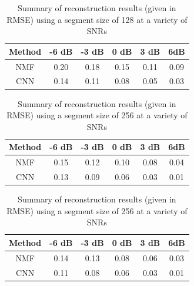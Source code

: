 \documentclass[12pt,chapterheads]{ucsd}
\begin{document}
\vspace{0.25in}
\begin{table}[!ht]
\caption{Summary of reconstruction results (given in RMSE) using a segment size of 128 at a variety of SNRs}

\vspace{-0.25in}
\begin{center}
\begin{tabular}{| c | c | c |  c | c | c |}

\hline
Method & -6 dB & -3 dB & 0 dB & 3 dB & 6dB \\

\hline
NMF & 0.20 & 0.18 & 0.15 & 0.11 & 0.09 \\

\hline
CNN & 0.14 & 0.11 & 0.08 & 0.05 & 0.03 \\

\hline
\end{tabular}
\end{center}
\label{table:results_seg_128}
\end{table}

\vspace{0.25in}
\begin{table}[!ht]
\caption{Summary of reconstruction results (given in RMSE) using a segment size of 256 at a variety of SNRs}

\vspace{-0.25in}
\begin{center}
\begin{tabular}{| c | c | c |  c | c | c |}

\hline
Method & -6 dB & -3 dB & 0 dB & 3 dB & 6dB \\

\hline
NMF & 0.15 & 0.12 & 0.10 & 0.08 & 0.04 \\

\hline
CNN & 0.13 & 0.09 & 0.06 & 0.03 & 0.01 \\

\hline
\end{tabular}
\end{center}
\label{table:results_seg_256}
\end{table}

\vspace{0.25in}
\begin{table}[!ht]
\caption{Summary of reconstruction results (given in RMSE) using a segment size of 256 at a variety of SNRs}

\vspace{-0.25in}
\begin{center}
\begin{tabular}{| c | c | c |  c | c | c |}

\hline
Method & -6 dB & -3 dB & 0 dB & 3 dB & 6dB \\

\hline
NMF & 0.14 & 0.13 & 0.08 & 0.06 & 0.03 \\

\hline
CNN & 0.11 & 0.08 & 0.06 & 0.03 & 0.01 \\

\hline
\end{tabular}
\end{center}
\label{table:results_seg_512}
\end{table}
\end{document}

